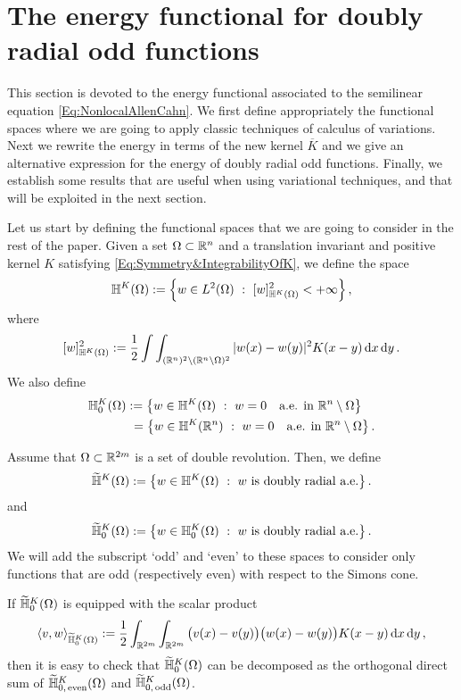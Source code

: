 \section{The energy functional for doubly radial odd functions}
\label{Sec:EnergyForOddF}


This section is devoted to the energy functional associated to the semilinear equation \eqref{Eq:NonlocalAllenCahn}. We first define appropriately the functional spaces where we are going to apply classic techniques of calculus of variations. Next we rewrite the energy in terms of the new kernel $\overline{K}$ and we give an alternative expression for the energy of doubly radial odd functions. Finally, we establish some results that are useful when using variational techniques, and that will be exploited in the next section.


Let us start by defining the functional spaces that we are going to consider in the rest of the paper. Given a set $\Omega \subset \mathbb{R}^n$ and a translation invariant and positive kernel $K$ satisfying \eqref{Eq:Symmetry&IntegrabilityOfK}, we define the space
$$
\mathbb{H}^K(\Omega) := \left \{ w \in L^2(\Omega) \ : \ [w]^2_{\mathbb{H}^K(\Omega)} < + \infty \right \},
$$
where
$$
[w]^2_{\mathbb{H}^K(\Omega)} := \dfrac{1}{2}\int\int_{(\mathbb{R}^{n})^2 \setminus (\mathbb{R}^n\setminus\Omega)^2} |w(x) - w(y)|^2 K(x-y) \,\mathrm{d} x \,\mathrm{d} y\,.
$$
We also define
\begin{align*}
	\mathbb{H}^K_0(\Omega) &:= \left \{ w \in \mathbb{H}^K(\Omega) \ : \  w = 0 \quad \textrm{a.e. in } \mathbb{R}^n \setminus \Omega \right \} \\
	&\ = \left \{ w \in \mathbb{H}^K(\mathbb{R}^n) \ : \  w = 0 \quad \textrm{a.e. in } \mathbb{R}^n \setminus \Omega \right \}.
\end{align*}

Assume that $\Omega \subset \mathbb{R}^{2m}$ is a set of double revolution. Then, we define
$$
\widetilde{\mathbb{H}}^K(\Omega) := \left \{ w \in \mathbb{H}^K(\Omega) \ : \ w \textrm{ is doubly radial a.e.} \right \}.
$$
and
$$
\widetilde{\mathbb{H}}^K_0(\Omega) := \left \{ w \in \mathbb{H}^K_0(\Omega) \ : \ w \textrm{ is doubly radial a.e.} \right \}.
$$
We will add the subscript `odd' and `even' to these spaces to consider only functions that are odd (respectively even) with respect to the Simons cone.


\begin{remark}
\label{Remark:DecompositionHK}
If $\widetilde{\mathbb{H}}^K_0(\Omega)$ is equipped with the scalar product
$$
\langle v,w \rangle_{\widetilde{\mathbb{H}}^K_0(\Omega)} := \dfrac{1}{2}\int_{\mathbb{R}^{2m}} \int_{\mathbb{R}^{2m}}  \big(v(x) - v(y)\big)\big(w(x) - w(y)\big) K(x-y) \,\mathrm{d} x \,\mathrm{d} y\,,
$$
then it is easy to check that $\widetilde{\mathbb{H}}^K_0(\Omega)$ can be decomposed as the orthogonal direct sum of $\widetilde{\mathbb{H}}^K_{0,\, \mathrm{even}}(\Omega)$ and $\widetilde{\mathbb{H}}^K_{0,\,\mathrm{odd}}(\Omega)$.
\end{remark}


